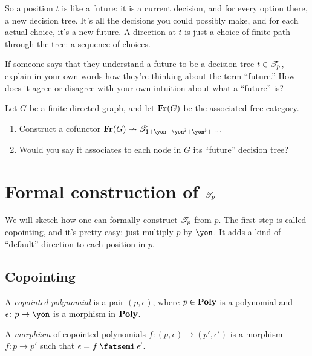 \documentclass[Book-Poly]{subfiles}
\begin{document}
So a position $t$ is like a future: it is a current decision, and for every option there, a new decision tree. It's all the decisions you could possibly make, and for each actual choice, it's a new future. A direction at $t$ is just a choice of finite path through the tree: a sequence of choices. 

\begin{exercise}
If someone says that they understand a future to be a decision tree $t\in\mathscr{T}_{p}$, explain in your own words how they're thinking about the term ``future.'' How does it agree or disagree with your own intuition about what a ``future'' is?
\end{exercise}

\begin{exercise}
Let $G$ be a finite directed graph, and let $\mathbf{Fr}(G)$ be the associated free category. 
\begin{enumerate}
	\item Construct a cofunctor $\Cat{Fr}(G)\cof\cofree{\1+\yon+\yon^\2+\yon^\3+\cdots}$.
	\item Would you say it associates to each node in $G$ its ``future'' decision tree?
\qedhere
\end{enumerate}
\end{exercise}

\section{Formal construction of $\mathscr{T}_{p}$}

We will sketch how one can formally construct $\mathscr{T}_{p}$ from $p$. The first step is called copointing, and it's pretty easy: just multiply $p$ by $\yon$. It adds a kind of ``default'' direction to each position in $p$.

\subsection{Copointing}

\begin{definition}
A \emph{copointed polynomial} is a pair $(p,\epsilon)$, where $p\in\mathbf{Poly}$ is a polynomial and $\epsilon\colon p\to\yon$ is a morphism in $\mathbf{Poly}$.

A \emph{morphism} of copointed polynomials $f\colon (p,\epsilon)\to(p',\epsilon')$ is a morphism $f\colon p\to p'$ such that $\epsilon=f\then\epsilon'$.
\end{definition}
\end{document}
